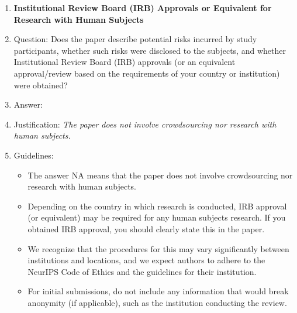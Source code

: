\documentclass{article}
\theoremstyle{plain}
\begin{document}
\begin{enumerate}
\item {\bf Institutional Review Board (IRB) Approvals or Equivalent for Research with Human Subjects}
    \item[] Question: Does the paper describe potential risks incurred by study participants, whether such risks were disclosed to the subjects, and whether Institutional Review Board (IRB) approvals (or an equivalent approval/review based on the requirements of your country or institution) were obtained?
    \item[] Answer: \answerNA %
    \item[] Justification: \textit{The paper does not involve crowdsourcing nor research with human subjects.}
    \item[] Guidelines:
    \begin{itemize}
        \item The answer NA means that the paper does not involve crowdsourcing nor research with human subjects.
        \item Depending on the country in which research is conducted, IRB approval (or equivalent) may be required for any human subjects research. If you obtained IRB approval, you should clearly state this in the paper. 
        \item We recognize that the procedures for this may vary significantly between institutions and locations, and we expect authors to adhere to the NeurIPS Code of Ethics and the guidelines for their institution. 
        \item For initial submissions, do not include any information that would break anonymity (if applicable), such as the institution conducting the review.
    \end{itemize}

\end{enumerate}
\end{document}
